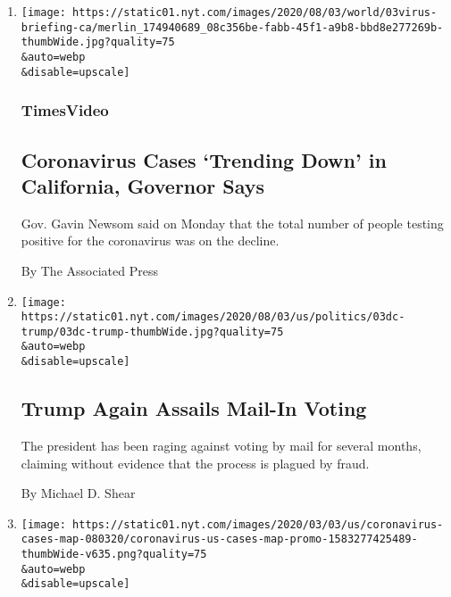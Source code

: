 \begin{enumerate}
\def\labelenumi{\arabic{enumi}.}
\item
  \href{/video/us/100000007271181/california-virus-cases-trend-down.html}{}

  \texttt{[image: https://static01.nyt.com/images/2020/08/03/world/03virus-briefing-ca/merlin\_174940689\_08c356be-fabb-45f1-a9b8-bbd8e277269b-thumbWide.jpg?quality=75\\\&auto=webp\\\&disable=upscale]}

  \hypertarget{timesvideo}{%
  \subsubsection{TimesVideo}\label{timesvideo}}

  \hypertarget{coronavirus-cases-trending-down-in-california-governor-says}{%
  \subsection{Coronavirus Cases `Trending Down' in California, Governor
  Says}\label{coronavirus-cases-trending-down-in-california-governor-says}}

  Gov. Gavin Newsom said on Monday that the total number of people
  testing positive for the coronavirus was on the decline.

  By The Associated Press
\item
  \href{/2020/08/03/us/politics/trump-mail-in-voting.html}{}

  \texttt{[image: https://static01.nyt.com/images/2020/08/03/us/politics/03dc-trump/03dc-trump-thumbWide.jpg?quality=75\\\&auto=webp\\\&disable=upscale]}

  \hypertarget{trump-again-assails-mail-in-voting}{%
  \subsection{Trump Again Assails Mail-In
  Voting}\label{trump-again-assails-mail-in-voting}}

  The president has been raging against voting by mail for several
  months, claiming without evidence that the process is plagued by
  fraud.

  By Michael D. Shear
\item
  \href{/2020/08/03/us/coronavirus-today.html}{}

  \texttt{[image: https://static01.nyt.com/images/2020/03/03/us/coronavirus-cases-map-080320/coronavirus-us-cases-map-promo-1583277425489-thumbWide-v635.png?quality=75\\\&auto=webp\\\&disable=upscale]}


\end{enumerate}
